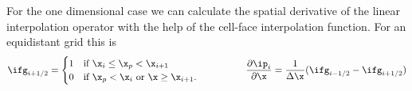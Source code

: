 For the one dimensional case we can calculate the spatial derivative of the linear interpolation operator with the help of the cell-face interpolation function. For an equidistant grid this is
\begin{equation*}
    \ifg_{i+1/2} = \begin{cases}
        1 & \text{if }   \x_i \leq \x_p < \x_{i+1} \\
        0 & \text{if }   \x_p < \x_{i} \text{ or } \x \geq \x_{i+1}.
    \end{cases} \qquad \hspace{1cm}
    \label{eq:gradInterp}
    \dfrac{\partial \ip_i}{\partial \x} = \dfrac{1}{\Delta \x} ( \ifg_{i-1/2} - \ifg_{i+1/2})
\end{equation*}
